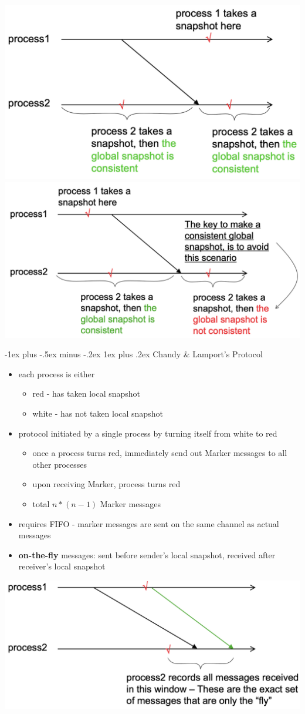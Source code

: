 \documentclass[10pt, landscape]{article}
\makeatletter
\renewcommand{\subsubsection}{\@startsection{subsubsection}{3}{0mm}%
  {-1ex plus -.5ex minus -.2ex}%
  {1ex plus .2ex}%
{\normalfont\small\bfseries}}%
\makeatother
\begin{document}
\begin{multicols*}{3}
  \includegraphics[width=0.48\linewidth]{cs4231-cgs-1.png} 
  \includegraphics[width=0.48\linewidth]{cs4231-cgs-2.png} 

  \subsubsection{Chandy \& Lamport's Protocol}

  \begin{itemize}
    \item each process is either
      \begin{itemize}
        \item red - has taken local snapshot
        \item white - has not taken local snapshot
      \end{itemize}
    \item protocol initiated by a single process by turning itself from white to red
      \begin{itemize}
        \item once a process turns red, immediately send out Marker messages to all other processes
        \item upon receiving Marker, process turns red
        \item total $n*(n-1)$ Marker messages
      \end{itemize}
    \item requires FIFO - marker messages are sent on the same channel as actual messages
    \item \textbf{on-the-fly} messages: sent before sender's local snapshot, received after receiver's local snapshot
  \end{itemize}
  \begin{tightcenter}
    \includegraphics[width=0.6\linewidth]{cs4231-cgs-onthefly.png} 
  \end{tightcenter}


\end{multicols*}
\end{document}
